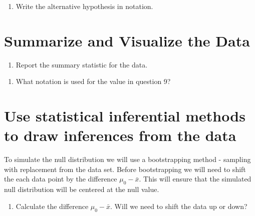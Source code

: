 \documentclass[
]{report}
\providecommand{\tightlist}{%
  \setlength{\itemsep}{0pt}\setlength{\parskip}{0pt}}
\begin{document}
\vspace{1in}

\begin{enumerate}
\def\labelenumi{\arabic{enumi}.}
\setcounter{enumi}{7}
\tightlist
\item
  Write the alternative hypothesis in notation.
\end{enumerate}

\vspace{1in}

\hypertarget{summarize-and-visualize-the-data-2}{%
\section{Summarize and Visualize the Data}\label{summarize-and-visualize-the-data-2}}

\begin{enumerate}
\def\labelenumi{\arabic{enumi}.}
\setcounter{enumi}{8}
\tightlist
\item
  Report the summary statistic for the data.
\end{enumerate}

\vspace{0.5in}

\begin{enumerate}
\def\labelenumi{\arabic{enumi}.}
\setcounter{enumi}{9}
\tightlist
\item
  What notation is used for the value in question 9?
\end{enumerate}

\vspace{0.5in}

\hypertarget{use-statistical-inferential-methods-to-draw-inferences-from-the-data}{%
\section{Use statistical inferential methods to draw inferences from the data}\label{use-statistical-inferential-methods-to-draw-inferences-from-the-data}}

To simulate the null distribution we will use a bootstrapping method - sampling with replacement from the data set. Before bootstrapping we will need to shift the each data point by the difference \(\mu_0 - \bar{x}\). This will ensure that the simulated null distribution will be centered at the null value.

\begin{enumerate}
\def\labelenumi{\arabic{enumi}.}
\setcounter{enumi}{10}
\tightlist
\item
  Calculate the difference \(\mu_0 - \bar{x}\). Will we need to shift the data up or down?
\end{enumerate}
\end{document}
